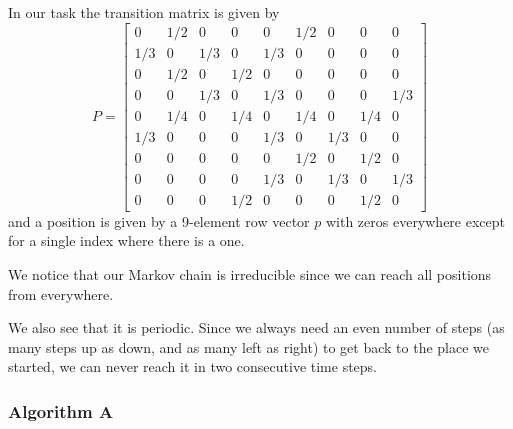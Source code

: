 
In our task the transition matrix is given by
\begin{equation*}
 P = 
\begin{bmatrix}
          0 &    1/2       &   0       &   0      &    0  &   1/2        &  0  &        0       &   0 \\
     1/3    &     0  &  1/3     &    0 &   1/3      &   0&         0        & 0        & 0 \\
          0 &    1/2         & 0   & 1/2       &  0       &  0        & 0        & 0  &       0 \\
          0 &         0  &  1/3       &  0   & 1/3       &  0       &  0       &  0  &  1/3 \\
          0 &    1/4       &  0  &  1/4   &      0  &  1/4       &  0  &  1/4  &       0 \\
     1/3 &         0       &  0       &  0  &  1/3   &      0  &  1/3       &  0  &       0 \\
          0 &         0  &       0       &  0       &  0  &  1/2       &  0  &  1/2  &       0 \\
          0 &         0       &  0       &  0   & 1/3       &  0  &  1/3       &  0  &  1/3 \\
          0 &         0     &    0   & 1/2       &  0        & 0       &  0  &  1/2  &       0 
\end{bmatrix}
\end{equation*}
and a position is given by a 9-element row vector $p$ with zeros everywhere except for a single index where there is a one. 

We notice that our Markov chain is irreducible since we can reach all positions from everywhere. 

We also see that it is periodic. Since we always need an even number of steps (as many steps up as down, and as many left as right) to get back to the place we started, we can never reach it in two consecutive time steps.

\subsubsection{Algorithm A}
\label{sec:alg1A}

